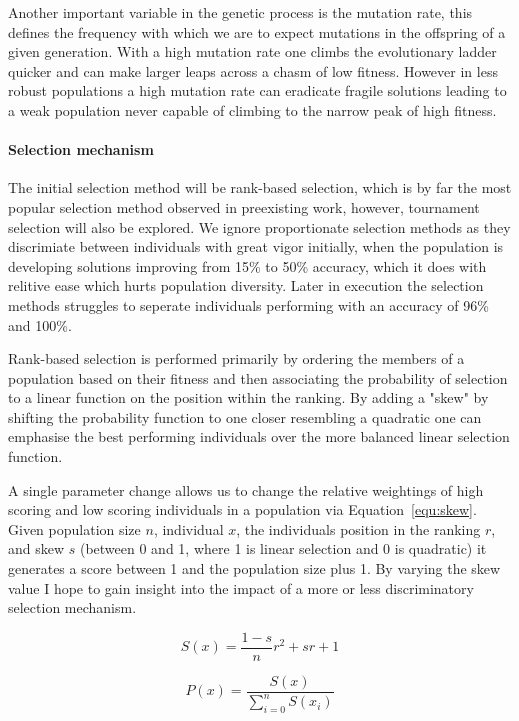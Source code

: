 Another important variable in the genetic process is the mutation rate, this defines the
frequency with which we are to expect mutations in the offspring of a given generation.
With a high mutation rate one climbs the evolutionary ladder quicker and can make larger
leaps across a chasm of low fitness. However in less robust populations a high mutation rate
can eradicate fragile solutions leading to a weak population never capable of
climbing to the narrow peak of high fitness.

\paragraph{Selection mechanism}
The initial selection method will be rank-based selection, which is by far
the most popular selection method observed in preexisting work, however,
tournament selection will also be explored. We ignore proportionate selection
methods as they discrimiate between individuals with great vigor initially,
when the population is developing solutions improving from 15\% to 50\%
accuracy, which it does with relitive ease which hurts population diversity.
Later in execution the selection methods struggles to seperate individuals
performing with an accuracy of 96\% and 100\%.

Rank-based selection is performed primarily by ordering the members of a population
based on their fitness and then associating the probability of selection to a
linear function on the
position within the ranking. By adding a "skew" by shifting the probability function
to one closer resembling a quadratic one can emphasise the best performing
individuals over the more balanced linear selection function.

A single parameter change allows us to change the relative weightings of high scoring
and low scoring individuals in a population via Equation~\ref{equ:skew}. Given
population size $n$, individual $x$, the individuals position in the ranking $r$, and
skew $s$ (between 0 and 1, where 1 is linear selection and 0 is quadratic) it
generates a score between 1 and the population size plus 1. By varying the skew
value I hope to gain insight into the impact of a more or less discriminatory
selection mechanism.

\begin{equation}
	\label{equ:skew}
	S(x) = \frac{1-s}{n}r^2 + sr + 1
\end{equation}

\begin{equation}
	\label{equ:prob}
	P(x) = \frac{S(x)}{\sum^{n}_{i=0} S(x_i)}
\end{equation}

